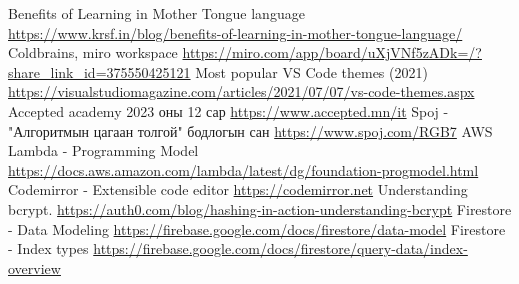 \documentclass[12pt,A4]{report}
\begin{document}
\singlespace
{}
\begin{thebibliography}{}
    Benefits of Learning in Mother Tongue language \url{https://www.krsf.in/blog/benefits-of-learning-in-mother-tongue-language/}
    Coldbrains, miro workspace \url{https://miro.com/app/board/uXjVNf5zADk=/?share_link_id=375550425121}
    Most popular VS Code themes (2021) \url{https://visualstudiomagazine.com/articles/2021/07/07/vs-code-themes.aspx}
    Accepted academy 2023 оны 12 сар \url{https://www.accepted.mn/it}
    Spoj - "Алгоритмын цагаан толгой" бодлогын сан \url{https://www.spoj.com/RGB7}
    AWS Lambda - Programming Model \url{https://docs.aws.amazon.com/lambda/latest/dg/foundation-progmodel.html}
    Codemirror - Extensible code editor \url{https://codemirror.net}
    Understanding bcrypt. \url{https://auth0.com/blog/hashing-in-action-understanding-bcrypt}
    Firestore - Data Modeling \url{https://firebase.google.com/docs/firestore/data-model}
    Firestore - Index types \url{https://firebase.google.com/docs/firestore/query-data/index-overview}
\end{thebibliography}


\appendix
{}


\end{document}
